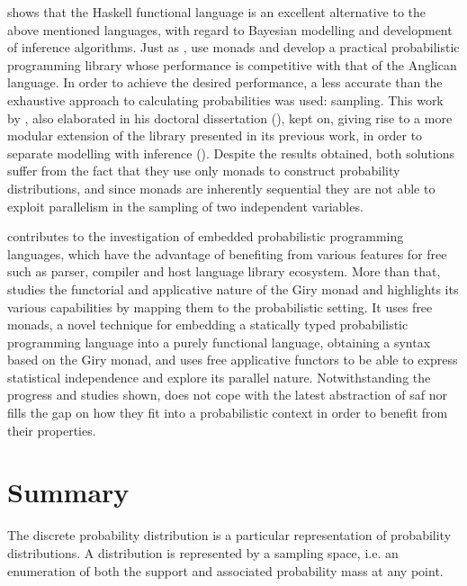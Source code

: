 \documentclass[
  oneside,
  11pt, a4paper,
  footinclude=true,
  headinclude=true,
  cleardoublepage=empty
]{scrbook}
\theoremstyle{definition}
\theoremstyle{definition}
\begin{document}
        \cite{Scibior:2015:PPP:2887747.2804317} shows that the Haskell functional language is an excellent alternative to the above mentioned languages, ​with regard to Bayesian modelling and development of inference algorithms. Just as \cite{erwig_kollmansberger_2006}, \cite{Scibior:2015:PPP:2887747.2804317} use monads and develop a practical probabilistic programming library whose performance is competitive with that of the Anglican language. In order to achieve the desired performance, a less accurate than the exhaustive approach to calculating probabilities was used: sampling. This work by \cite{Scibior:2015:PPP:2887747.2804317}, also elaborated in his doctoral dissertation (\cite{Scibior19}), kept on, giving rise to a more modular extension of the library presented in its previous work, in order to separate modelling with inference (\cite{scibior2018functional}). Despite the results obtained, both solutions suffer from the fact that they use only monads to construct probability distributions, and since monads are inherently sequential they are not able to exploit parallelism in the sampling of two independent variables.
                
        \cite{jtobin} contributes to the investigation of embedded probabilistic programming languages, which have the advantage of benefiting from various features for free such as parser, compiler and host language library ecosystem. More than that, \cite{jtobin} studies the functorial and applicative nature of the Giry monad and highlights its various capabilities by mapping them to the probabilistic setting. It uses free monads, a novel technique for embedding a statically typed probabilistic programming language into a purely functional language, obtaining a syntax based on the Giry monad, and uses free applicative functors to be able to express statistical independence and explore its parallel nature. Notwithstanding the progress and studies shown, \cite{jtobin} does not cope with the latest abstraction of \gls{saf} nor fills the gap on how they fit into a probabilistic context in order to benefit from their properties.
        
    \section{Summary}\label{sec-summary}
    
    The discrete probability distribution is a particular representation of probability distributions. A distribution is represented by a sampling space, i.e. an enumeration of both the support and associated probability mass at any point.
    
\end{document}
